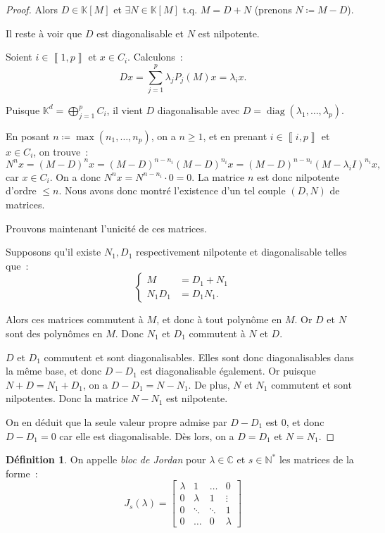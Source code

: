 \documentclass{report}
\theoremstyle{definition}
\newtheorem{déf}[thm]{Définition}
\theoremstyle{remark}
\numberwithin{equation}{section}
\newcommand{\K}{\mathbb K}
\newcommand{\C}{\mathbb C}
\newcommand{\N}{\mathbb N}
\newcommand{\Ns}{\N^{*}}
\newcommand{\tq}{\text{ t.q. }}
\DeclareMathOperator{\diag}{diag}
\newcommand{\intint}[2]{\left\llbracket#1, #2\right\rrbracket}
\begin{document}
\begin{proof}
			Alors $D \in \K[M]$ et $\exists N \in \K[M] \tq M = D+N$ (prenons $N \coloneqq M-D$).

			Il reste à voir que $D$ est diagonalisable et $N$ est nilpotente.

			Soient $i \in \intint 1p$ et $x \in C_i$. Calculons~:
			\begin{equation}
				Dx = \sum_{j=1}^p\lambda_jP_j(M)x = \lambda_ix.
			\end{equation}

			Puisque $\K^d = \bigoplus_{j = 1}^pC_i$, il vient $D$ diagonalisable avec $D = \diag(\lambda_1, \ldots, \lambda_p)$.

			En posant $n \coloneqq \max\left(n_1, \ldots, n_p\right)$, on a $n \geq 1$, et en prenant $i \in \intint ip$ et $x \in C_i$, on trouve~:
			\begin{equation}
				N^nx = (M-D)^nx = (M-D)^{n-n_i}(M-D)^{n_i}x = (M-D)^{n-n_i}\left(M-\lambda_iI\right)^{n_i}x,
			\end{equation}
			car $x \in C_i$. On a donc $N^nx = N^{n-n_i} \cdot 0 = 0$. La matrice $n$ est donc nilpotente d'ordre $\leq n$. Nous avons donc montré l'existence
			d'un tel couple $(D, N)$ de matrices.

			Prouvons maintenant l'unicité de ces matrices.

			Supposons qu'il existe $N_1, D_1$ respectivement nilpotente et diagonalisable telles que~:
			\begin{equation}
				\begin{cases}
				M &= D_1+N_1 \\
				N_1D_1 &= D_1N_1.
			\end{cases}
			\end{equation}

			Alors ces matrices commutent à $M$, et donc à tout polynôme en $M$. Or $D$ et $N$ sont des polynômes en $M$. Donc $N_1$ et $D_1$ commutent à $N$ et $D$.

			$D$ et $D_1$ commutent et sont diagonalisables. Elles sont donc diagonalisables dans la même base, et donc $D-D_1$ est diagonalisable également.
			Or puisque $N+D = N_1+D_1$, on a $D-D_1 = N-N_1$. De plus, $N$ et $N_1$ commutent et sont nilpotentes. Donc la matrice $N-N_1$ est nilpotente.

			On en déduit que la seule valeur propre admise par $D-D_1$ est 0, et donc $D-D_1 = 0$ car elle est diagonalisable. Dès lors, on a $D=D_1$ et $N=N_1$.
			\end{proof}

			\begin{déf} On appelle \textit{bloc de Jordan} pour $\lambda \in \C$ et $s \in \Ns$ les matrices de la forme~:
			\begin{equation}
				J_s(\lambda) =
				\begin{bmatrix}
						\lambda & 1 & \ldots & 0 \\
					0 & \lambda & 1 & \vdots \\
					0 & \ddots & \ddots & 1 \\
					0 & \ldots & 0 & \lambda
				\end{bmatrix}
			\end{equation}
			\end{déf}
\end{document}
